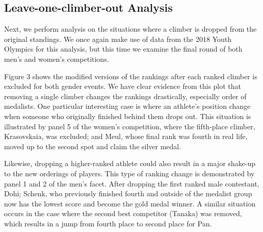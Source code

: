 \documentclass[12pt]{article}
\begin{document}
\hypertarget{leave-one-climber-out-analysis}{%
\subsection{Leave-one-climber-out
Analysis}\label{leave-one-climber-out-analysis}}

Next, we perform analysis on the situations where a climber is dropped
from the original standings. We once again make use of data from the
2018 Youth Olympics for this analysis, but this time we examine the
final round of both men's and women's competitions.

Figure 3 shows the modified versions of the rankings after each ranked
climber is excluded for both gender events. We have clear evidence from
this plot that removing a single climber changes the rankings
drastically, especially order of medalists. One particular interesting
case is where an athlete's position change when someone who originally
finished behind them drops out. This situation is illustrated by panel 5
of the women's competition, where the fifth-place climber, Krasovskaia,
was excluded; and Meul, whose final rank was fourth in real life, moved
up to the second spot and claim the silver medal.

Likewise, dropping a higher-ranked athlete could also result in a major
shake-up to the new orderings of players. This type of ranking change is
demonstrated by panel 1 and 2 of the men's facet. After dropping the
first ranked male contestant, Dohi; Schenk, who previously finished
fourth and outside of the medalist group now has the lowest score and
become the gold medal winner. A similar situation occurs in the case
where the second best competitor (Tanaka) was removed, which results in
a jump from fourth place to second place for Pan.
\end{document}
